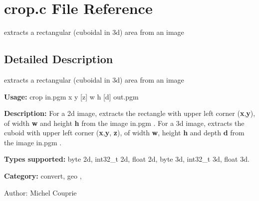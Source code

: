 \section{crop.c File Reference}
\label{crop_8c}
extracts a rectangular (cuboidal in 3d) area from an image  




\label{_details}
\subsection{Detailed Description}
extracts a rectangular (cuboidal in 3d) area from an image 

{\bf Usage:} crop in.pgm x y [z] w h [d] out.pgm

{\bf Description:} For a 2d image, extracts the rectangle with upper left corner ({\bf x},{\bf y}), of width {\bf w} and height {\bf h} from the image in.pgm . For a 3d image, extracts the cuboid with upper left corner ({\bf x},{\bf y}, {\bf z}), of width {\bf w}, height {\bf h} and depth {\bf d} from the image in.pgm .

{\bf Types supported:} byte 2d, int32\_\-t 2d, float 2d, byte 3d, int32\_\-t 3d, float 3d.

{\bf Category:} convert, geo ,

\begin{Desc}
\item[Author:]Michel Couprie \end{Desc}
